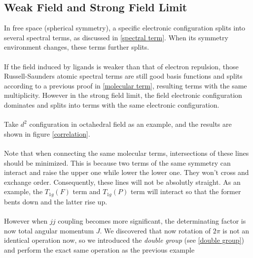 \subsection{Weak Field and Strong Field Limit}\label{split}
%
In free space (spherical symmetry), a specific electronic configuration splits into several spectral terms, 
as discussed in \ref{spectral term}.
When its symmetry environment changes, these terms further splits.\\ \\
%
If the field induced by ligands is weaker than that of electron repulsion, 
those Russell-Saunders atomic spectral terms are still good basis functions and splits according to a previous proof in \ref{molecular term}, 
resulting terms with the same multiplicity.
However in the strong field limit, the field electronic configuration dominates and 
splits into terms with the same electronic configuration.\\ \\
%
Take $d^2$ configuration in octahedral field as an example, and the results are shown in figure \ref{correlation}.\\ \\
Note that when connecting the same molecular terms, intersections of these lines should be minimized. 
This is because two terms of the same symmetry can interact and raise the upper one while lower the lower one. They won't cross and exchange order.
Consequently, these lines will not be absolutly straight. 
As an example, the $T_{1g}(F)$ term and $T_{1g}(P)$ term will interact so that the former bents down and the latter rise up.\\ \\
%
However when $jj$ coupling becomes more significant, the determinating factor is now total angular momentum $J$. 
We discovered that now rotation of $2\pi$ is not an identical operation now, 
so we introduced the \emph{double group} (see \ref{double group}) and perform the exact same operation as the previous example
%

